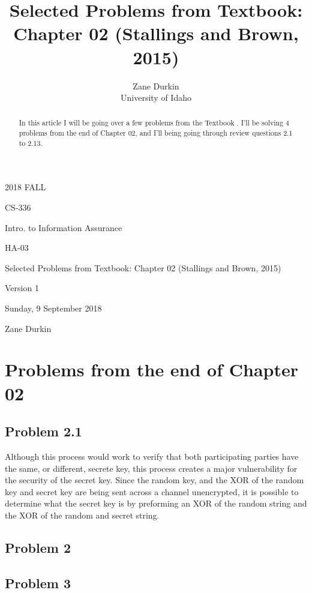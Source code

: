 \documentclass[14pt]{article}
\begin{document}
\title{Selected Problems from Textbook: Chapter 02 (Stallings and Brown, 2015)}

\author{Zane Durkin\\
    University of Idaho}
\begin{description}[leftmargin=!, labelwidth=\widthof{\bfseries Author(s) Name(s)}]
\item [Year and Semester] 2018 FALL
\item [Course Number] CS-336
\item [Course Title] Intro. to Information Assurance
\item [Work Number] HA-03
\item [Work Name] Selected Problems from Textbook: Chapter 02 (Stallings and Brown, 2015)
\item [Work Version] Version 1
\item [Long Date] Sunday, 9 September 2018
\item [Author(s) Name(s)] Zane Durkin
\end{description}
\begin{abstract}
In this article I will be going over a few problems from the Textbook \cite{stallings}. I'll be solving 4 problems from the end of Chapter 02, and I'll being going through review questions 2.1 to 2.13.
\end{abstract}

\section{Problems from the end of Chapter 02}

\subsection{Problem  2.1}
Although this process would work to verify that both participating parties have the same, or different, secrete key, this process creates a major vulnerability for the security of the secret key. Since the random key, and the XOR of the random key and secret key are being sent across a channel unencrypted, it is possible to determine what the secret key is by preforming an XOR of the random string and the XOR of the random and secret string.

\subsection{Problem  2}


\subsection{Problem  3}
\end{document}
